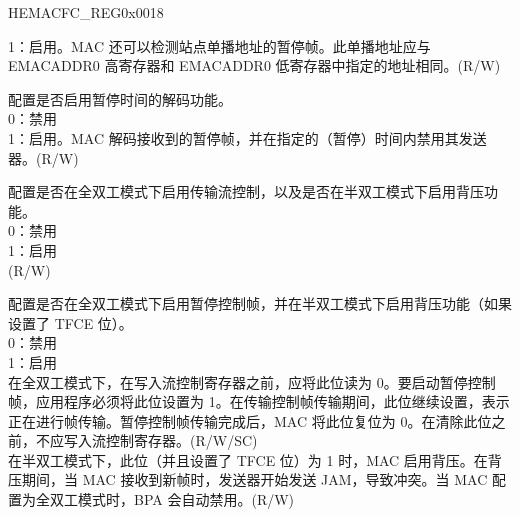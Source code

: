 \begin{register}{H}{EMACFC\_REG}{0x0018}
\begin{regdesc}
\begin{reglist}
1：启用。MAC 还可以检测站点单播地址的暂停帧。此单播地址应与 EMACADDR0 高寄存器和 EMACADDR0 低寄存器中指定的地址相同。(R/W)
\item [RFCE] 配置是否启用暂停时间的解码功能。\\
0：禁用\\
1：启用。MAC 解码接收到的暂停帧，并在指定的（暂停）时间内禁用其发送器。(R/W)
\item [TFCE] 配置是否在全双工模式下启用传输流控制，以及是否在半双工模式下启用背压功能。\\
0：禁用\\
1：启用\\(R/W)
\item [FCBBA] 配置是否在全双工模式下启用暂停控制帧，并在半双工模式下启用背压功能（如果设置了 TFCE 位）。\\
0：禁用\\
1：启用\\
在全双工模式下，在写入流控制寄存器之前，应将此位读为 0。要启动暂停控制帧，应用程序必须将此位设置为 1。在传输控制帧传输期间，此位继续设置，表示正在进行帧传输。暂停控制帧传输完成后，MAC 将此位复位为 0。在清除此位之前，不应写入流控制寄存器。(R/W/SC)\\
在半双工模式下，此位（并且设置了 TFCE 位）为 1 时，MAC 启用背压。在背压期间，当 MAC 接收到新帧时，发送器开始发送 JAM，导致冲突。当 MAC 配置为全双工模式时，BPA 会自动禁用。(R/W)
\end{reglist}\end{regdesc}
\end{register}

